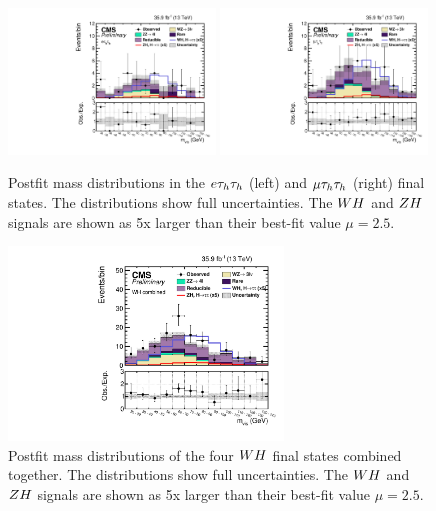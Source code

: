 \begin{figure}[h!]
 \begin{center}
  \includegraphics[width=0.49\textwidth]{higgs_to_taus_vh/plots/wh/ett_postfit.pdf}
  \includegraphics[width=0.49\textwidth]{higgs_to_taus_vh/plots/wh/mtt_postfit.pdf}
 \end{center}
 \caption{Postfit mass distributions in the $e\tau_{h}\tau_{h}$ (left) 
 and $\mu\tau_{h}\tau_{h}$ (right) final states.
 The distributions show full uncertainties.
 The $WH$ and $ZH$ signals are shown as 5x larger than their best-fit
 value $\mu = 2.5$.
 }
 \label{fig:mass_ltt}
\end{figure}

\begin{figure}[h!]
 \begin{center}
  \includegraphics[width=0.65\textwidth]{higgs_to_taus_vh/plots/wh/wh_postfit.pdf}
 \end{center}
 \caption{Postfit mass distributions of the four $WH$ final states
 combined together. 
 The distributions show full uncertainties.
 The $WH$ and $ZH$ signals are shown as 5x larger than their best-fit
 value $\mu = 2.5$.
 }
 \label{fig:mass_wh}
\end{figure}



